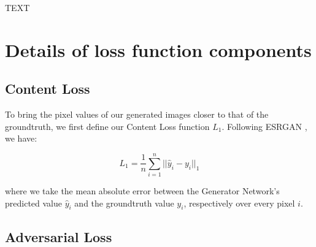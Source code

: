 \documentclass[tc, manuscript]{copernicus}
\begin{document}
\conclusions  %
TEXT












\appendix

\section{Details of loss function components} \label{appendix:A}

\subsection{Content Loss}

To bring the pixel values of our generated images closer to that of the groundtruth, we first define our Content Loss function $L_1$.
Following ESRGAN \citep{WangESRGANEnhancedSuperResolution2018}, we have:

\begin{equation}\label{eq:A1}
  L_1 = \dfrac{1}{n} \sum\limits_{i=1}^n ||\hat{y}_i - y_i||_{1}
\end{equation}

where we take the mean absolute error between the Generator Network's predicted value $\hat{y}_i$ and the groundtruth value $y_i$, respectively over every pixel $i$.

\subsection{Adversarial Loss}
\end{document}
